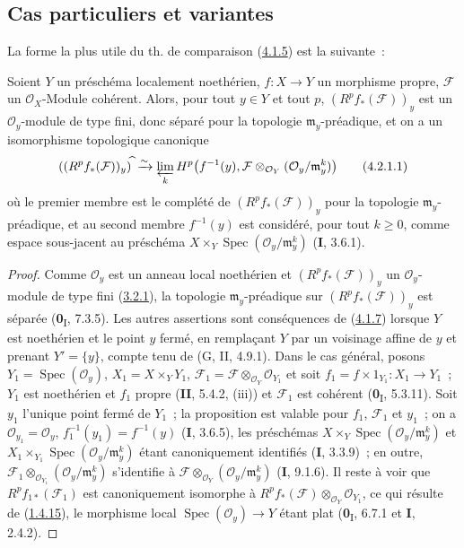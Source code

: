 \subsection{Cas particuliers et variantes}
\label{subsection:III.4.2-fr}

La forme la plus utile du th. de comparaison
(\hyperref[III.4.1.5-fr]{4.1.5}) est la suivante~:

\begin{proposition}[4.2.1]
\label{III.4.2.1-fr}
Soient $Y$ un préschéma localement noethérien, $f:X\to Y$ un morphisme
propre, $\mathcal F$ un $\mathcal O_X$-Module cohérent. Alors, pour tout
$y\in Y$ et tout $p$, $(R^pf_*(\mathcal F))_y$ est
un $\mathcal O_y$-module de type fini, donc séparé pour la topologie
$\mathfrak m_y$-préadique, et on a un isomorphisme topologique canonique
\[
((R^pf_*(\mathcal F))_y)^{\widehat{\,}}
\xrightarrow{\sim}
\varprojlim_kH^p\bigl(f^{-1}(y),
\mathcal F\otimes_{\mathcal O_Y}(\mathcal O_y/\mathfrak m_y^k)\bigr)
\tag{4.2.1.1}\label{III.4.2.1.1-fr}
\]
où le premier membre est le complété de $(R^pf_*(\mathcal F))_y$ pour la
topologie $\mathfrak m_y$-préadique, et au second membre $f^{-1}(y)$ est
considéré, pour tout $k\geq0$, comme espace sous-jacent au préschéma
$X\times_Y\operatorname{Spec}(\mathcal O_y/\mathfrak m_y^k)$
\textup{(\textbf{I}, 3.6.1)}.
\end{proposition}

\begin{proof}
Comme $\mathcal O_y$ est un anneau local noethérien et
$(R^pf_*(\mathcal F))_y$ un $\mathcal O_y$-module de type fini
(\hyperref[III.3.2.1-fr]{3.2.1}), la topologie $\mathfrak m_y$-préadique
sur $(R^pf_*(\mathcal F))_y$ est séparée (\textbf{0}\textsubscript{I}, 7.3.5). Les
autres assertions sont conséquences de (\hyperref[III.4.1.7-fr]{4.1.7})
lorsque $Y$ est noethérien et le point $y$ fermé, en remplaçant $Y$ par un
voisinage affine de $y$ et prenant $Y'=\{y\}$, compte tenu de
(G, II, 4.9.1). Dans le cas général, posons
$Y_1=\operatorname{Spec}(\mathcal O_y)$, $X_1=X\times_YY_1$,
$\mathcal F_1=\mathcal F\otimes_{\mathcal O_Y}\mathcal O_{Y_1}$
et soit $f_1=f\times1_{Y_1}:X_1\to Y_1$~; $Y_1$ est noethérien et $f_1$
propre (\textbf{II}, 5.4.2, (iii)) et $\mathcal F_1$ est cohérent
(\textbf{0}\textsubscript{I}, 5.3.11). Soit $y_1$ l'unique point fermé de $Y_1$~;
la proposition est valable pour $f_1$, $\mathcal F_1$ et $y_1$~; on a
$\mathcal O_{y_1}=\mathcal O_y$, $f_1^{-1}(y_1)=f^{-1}(y)$ (\textbf{I}, 3.6.5),
les préschémas
$X\times_Y\operatorname{Spec}(\mathcal O_y/\mathfrak m_y^k)$ et
$X_1\times_{Y_1}\operatorname{Spec}(\mathcal O_y/\mathfrak m_y^k)$ étant
canoniquement identifiés (\textbf{I}, 3.3.9)~; en outre,
$\mathcal F_1\otimes_{\mathcal O_{Y_1}}
(\mathcal O_y/\mathfrak m_y^k)$ s'identifie à
$\mathcal F\otimes_{\mathcal O_Y}(\mathcal O_y/\mathfrak m_y^k)$
(\textbf{I}, 9.1.6). Il reste à voir que $R^pf_{1*}(\mathcal F_1)$ est
canoniquement isomorphe à
$R^pf_*(\mathcal F)\otimes_{\mathcal O_Y}\mathcal O_{Y_1}$, ce qui
résulte de (\hyperref[III.1.4.15-fr]{1.4.15}), le morphisme local
$\operatorname{Spec}(\mathcal O_y)\to Y$ étant plat
(\textbf{0}\textsubscript{I}, 6.7.1 et \textbf{I}, 2.4.2).
\end{proof}

